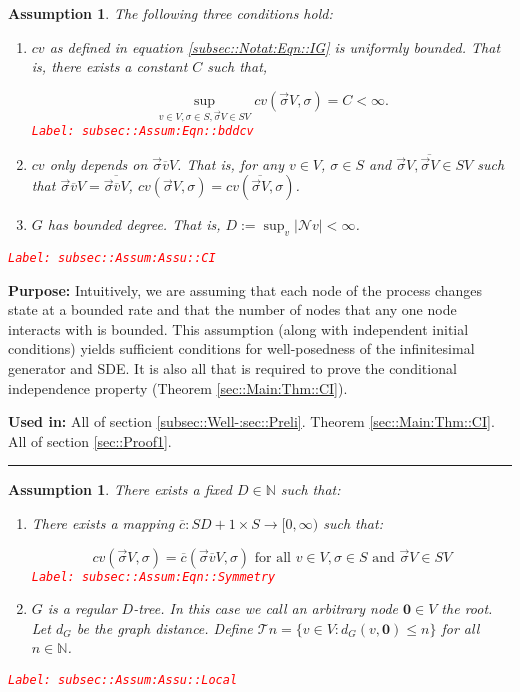 \documentclass[12pt]{article}
\newcommand{\mb}{\mathbb}
\newcommand{\mc}{\mathcal}
\newcommand{\ra}{\rightarrow}
\newcommand{\ov}{\overline}
\newcommand{\te}{\text}
\newcommand{\tr}{\textcolor{red}}
\newcommand{\labe}[1]{\tr{\texttt{Label: #1}}}
\newcommand{\purpose}{\textbf{Purpose: }}
\newcommand{\usein}{\textbf{Used in: }}
\newcommand{\lin}{\rule{\linewidth}{0.4 pt}}
\newcommand{\defeq}{:=}								%
\renewcommand{\root}{\mathbf{0}}				%
\renewcommand{\v}{v}							%
\renewcommand{\S}{S}							%
\newcommand{\s}{\sigma}							%
\newcommand{\sv}{\vec{\s}}						%
\newcommand{\IGr}{c}							%
\newcommand{\neigh}{\mc{N}}						%
\newcommand{\cl}{\ov}							%
\newcommand{\const}{C}							%
\newcommand{\degr}{D}							%
\newcommand{\IGrg}{\ov{c}}						%
\newcommand{\gdist}{d_G}						%
\newcommand{\tree}{\mc{T}}						%
\newtheorem{assu}[thms]{Assumption}
\begin{document}
\begin{assu}
The following three conditions hold:
\begin{enumerate}
\item \(\IGr{\v}\) as defined in equation \eqref{subsec::Notat:Eqn::IG} is uniformly bounded. That is, there exists a constant \(\const{}\) such that,

\begin{equation}
\sup_{\v\in V,\s \in \S,\sv{}{V}\in \S{V}} \IGr{\v}(\sv{}{V},\s) = \const{} < \infty.
\label{subsec::Assum:Eqn::bddcv}
\end{equation}
\labe{subsec::Assum:Eqn::bddcv}

\item \(\IGr{\v}\) only depends on \(\sv{\cl{\v}}{V}\). That is, for any \(\v\in V\), \(\s\in \S\) and \(\sv{}{V},\ov{\sv{}{V}} \in \S{V}\) such that \(\sv{\cl{\v}}{V} = \ov{\sv{\cl{\v}}{V}}\), \(\IGr{\v}(\sv{}{V},\s) = \IGr{\v}(\ov{\sv{}{V}},\s)\).

\item \(G\) has bounded degree. That is, \(\degr \defeq \sup_\v |\neigh{\v}| < \infty\).
\end{enumerate}
\label{subsec::Assum:Assu::CI}\labe{subsec::Assum:Assu::CI}
\end{assu}

\purpose Intuitively, we are assuming that each node of the process changes state at a bounded rate and that the number of nodes that any one node interacts with is bounded. This assumption (along with independent initial conditions) yields sufficient conditions for well-posedness of the infinitesimal generator and SDE. It is also all that is required to prove the conditional independence property (Theorem \ref{sec::Main:Thm::CI}). 

\usein All of section \ref{subsec::Well-:sec::Preli}. Theorem \ref{sec::Main:Thm::CI}. All of section \ref{sec::Proof1}.

\lin

\begin{assu}
There exists a fixed \(\degr\in \mb{N}\) such that:

\begin{enumerate}
\item There exists a mapping \(\IGrg: \S{\degr+1} \times \S \ra [0,\infty)\) such that:

\begin{equation}
\IGr{\v}(\sv{}{V},\s) = \IGrg(\sv{\cl{\v}}{V},\s) \te{ for all } \v\in V, \s\in \S\te{ and } \sv{}{V} \in \S{V}
\label{subsec::Assum:Eqn::Symmetry}
\end{equation}
\labe{subsec::Assum:Eqn::Symmetry}

\item \(G\) is a regular \(\degr\)-tree. In this case we call an arbitrary node \(\root\in V\) the root. Let \(\gdist\) be the graph distance. Define \(\tree{n} = \{\v \in V: \gdist(\v,\root) \leq n\}\) for all \(n\in \mb{N}\).
\end{enumerate}
\label{subsec::Assum:Assu::Local}\labe{subsec::Assum:Assu::Local}
\end{assu}
\end{document}

